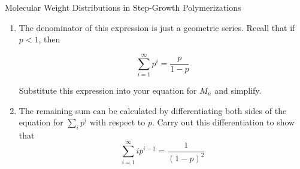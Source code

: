 \begin{activity}{Molecular Weight Distributions in Step-Growth Polymerizations}
\begin{exercises}
\begin{enumerate}
\begin{solution}
{					}\end{solution}
					
				\item The denominator of this expression is just a geometric series.  Recall that if $p < 1$, then 
		
			\begin{equation*}
				\sum_{i=1}^{\infty} p^i = \frac{p}{1-p}
			\end{equation*}
			
					Substitute this expression into your equation for $M_n$ and simplify.
					
					\begin{solution}\end{solution}
			
				\item The remaining sum can be calculated by differentiating both sides of the equation for $\sum_i p^i$ with respect to $p$.  Carry out this differentiation to show that
						\begin{equation*}
							\sum_{i=1}^{\infty} ip^{i-1} = \frac{1}{(1-p)^2}
						\end{equation*}
				
					\begin{solution}
\end{solution}
\end{enumerate}
\end{exercises}
\end{activity}
